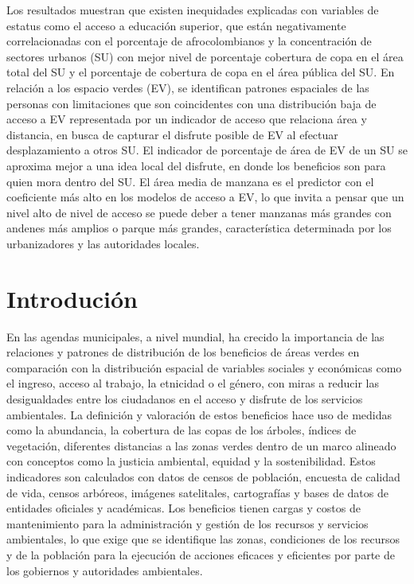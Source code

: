 \documentclass[12pt,]{book}
\begin{document}
Los resultados muestran que existen inequidades explicadas con variables
de estatus como el acceso a educación superior, que están negativamente
correlacionadas con el porcentaje de afrocolombianos y la concentración
de sectores urbanos (SU) con mejor nivel de porcentaje cobertura de copa
en el área total del SU y el porcentaje de cobertura de copa en el área
pública del SU. En relación a los espacio verdes (EV), se identifican
patrones espaciales de las personas con limitaciones que son
coincidentes con una distribución baja de acceso a EV representada por
un indicador de acceso que relaciona área y distancia, en busca de
capturar el disfrute posible de EV al efectuar desplazamiento a otros
SU. El indicador de porcentaje de área de EV de un SU se aproxima mejor
a una idea local del disfrute, en donde los beneficios son para quien
mora dentro del SU. El área media de manzana es el predictor con el
coeficiente más alto en los modelos de acceso a EV, lo que invita a
pensar que un nivel alto de nivel de acceso se puede deber a tener
manzanas más grandes con andenes más amplios o parque más grandes,
característica determinada por los urbanizadores y las autoridades
locales.

\chapter{Introdución}\label{intro}

En las agendas municipales, a nivel mundial, ha crecido la importancia
de las relaciones y patrones de distribución de los beneficios de áreas
verdes en comparación con la distribución espacial de variables sociales
y económicas como el ingreso, acceso al trabajo, la etnicidad o el
género, con miras a reducir las desigualdades entre los ciudadanos en el
acceso y disfrute de los servicios ambientales. La definición y
valoración de estos beneficios hace uso de medidas como la abundancia,
la cobertura de las copas de los árboles, índices de vegetación,
diferentes distancias a las zonas verdes dentro de un marco alineado con
conceptos como la justicia ambiental, equidad y la sostenibilidad. Estos
indicadores son calculados con datos de censos de población, encuesta de
calidad de vida, censos arbóreos, imágenes satelitales, cartografías y
bases de datos de entidades oficiales y académicas. Los beneficios
tienen cargas y costos de mantenimiento para la administración y gestión
de los recursos y servicios ambientales, lo que exige que se identifique
las zonas, condiciones de los recursos y de la población para la
ejecución de acciones eficaces y eficientes por parte de los gobiernos y
autoridades ambientales.
\end{document}
